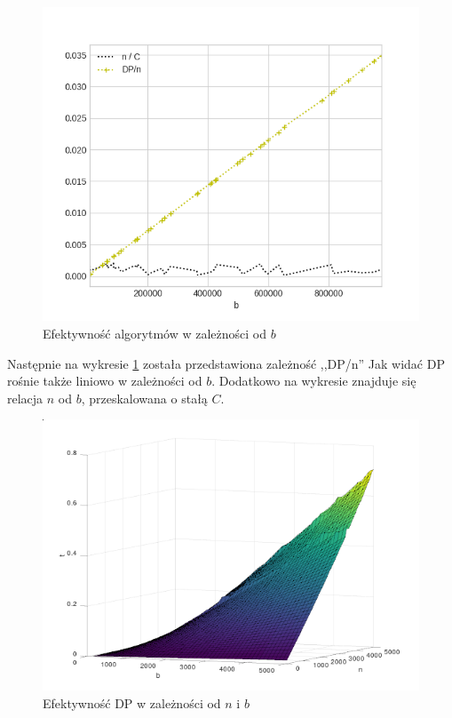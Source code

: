 \documentclass[11pt,twocolumn]{article}
\begin{document}
\begin{figure}[h!]
	\includegraphics[width=\linewidth]{speed-b-big.png}
	\caption{Efektywność algorytmów w zależności od $b$ \label{speed_b_big}}
\end{figure}

Następnie na wykresie \ref{speed_b_big} została przedstawiona zależność ,,DP/n'' 
Jak widać DP rośnie także liniowo w zależności od $b$.
Dodatkowo na wykresie znajduje się relacja $n$ od $b$, przeskalowana o stałą $C$.

\begin{figure}[h!]
	\includegraphics[width=\linewidth]{speed-bn.png}
	\caption{Efektywność DP w zależności od $n$ i $b$ \label{speed_bn}}
\end{figure}
\end{document}
